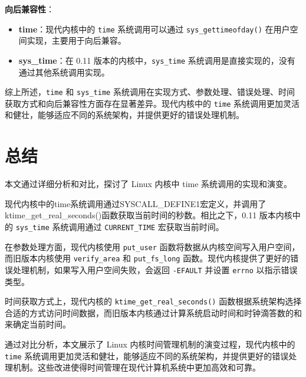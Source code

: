 \documentclass[12pt,hyperref,a4paper,UTF8]{ctexart}
\begin{document}
\textbf{向后兼容性}：

\begin{itemize}
    \item \textbf{time}：现代内核中的 \lstinline|time| 系统调用可以通过 \lstinline|sys_gettimeofday()| 在用户空间实现，主要用于向后兼容。
    \item \textbf{sys\_time}：在 0.11 版本的内核中，\lstinline|sys_time| 系统调用是直接实现的，没有通过其他系统调用实现。
\end{itemize}

综上所述，\lstinline|time| 和 \lstinline|sys_time| 系统调用在实现方式、参数处理、错误处理、时间获取方式和向后兼容性方面存在显著差异。现代内核中的 \lstinline|time| 系统调用更加灵活和健壮，能够适应不同的系统架构，并提供更好的错误处理机制。

\section{总结}

本文通过详细分析和对比，探讨了 Linux 内核中 time 系统调用的实现和演变。

现代内核中的time系统调用通过SYSCALL\_DEFINE1宏定义，并调用了ktime\_get\_real\_seconds()函数获取当前时间的秒数。相比之下，0.11 版本内核中的 \lstinline|sys_time| 系统调用通过 \lstinline|CURRENT_TIME| 宏获取当前时间。

在参数处理方面，现代内核使用 \lstinline|put_user| 函数将数据从内核空间写入用户空间，而旧版本内核使用 \lstinline|verify_area| 和 \lstinline|put_fs_long| 函数。现代内核提供了更好的错误处理机制，如果写入用户空间失败，会返回 \lstinline|-EFAULT| 并设置 \lstinline|errno| 以指示错误类型。

时间获取方式上，现代内核的 \lstinline|ktime_get_real_seconds()| 函数根据系统架构选择合适的方式访问时间数据，而旧版本内核通过计算系统启动时间和时钟滴答数的和来确定当前时间。

通过对比分析，本文展示了 Linux 内核时间管理机制的演变过程，现代内核中的 \lstinline|time| 系统调用更加灵活和健壮，能够适应不同的系统架构，并提供更好的错误处理机制。这些改进使得时间管理在现代计算机系统中更加高效和可靠。


\end{document}
